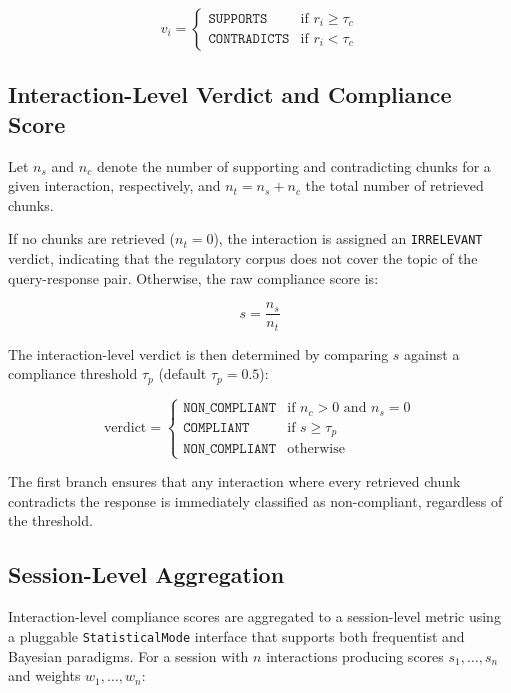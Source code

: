 \begin{equation}
    v_i = \begin{cases}
        \texttt{SUPPORTS}     & \text{if } r_i \geq \tau_c \\
        \texttt{CONTRADICTS}  & \text{if } r_i < \tau_c
    \end{cases}
\end{equation}

\subsection{Interaction-Level Verdict and Compliance Score}

Let $n_s$ and $n_c$ denote the number of supporting and contradicting chunks for a given interaction, respectively, and $n_t = n_s + n_c$ the total number of retrieved chunks.

If no chunks are retrieved ($n_t = 0$), the interaction is assigned an \texttt{IRRELEVANT} verdict, indicating that the regulatory corpus does not cover the topic of the query-response pair. Otherwise, the raw compliance score is:

\begin{equation}
    s = \frac{n_s}{n_t}
\end{equation}

The interaction-level verdict is then determined by comparing $s$ against a compliance threshold $\tau_p$ (default $\tau_p = 0.5$):

\begin{equation}
    \text{verdict} = \begin{cases}
        \texttt{NON\_COMPLIANT} & \text{if } n_c > 0 \text{ and } n_s = 0 \\
        \texttt{COMPLIANT}      & \text{if } s \geq \tau_p \\
        \texttt{NON\_COMPLIANT} & \text{otherwise}
    \end{cases}
\end{equation}

The first branch ensures that any interaction where every retrieved chunk contradicts the response is immediately classified as non-compliant, regardless of the threshold.

\subsection{Session-Level Aggregation}

Interaction-level compliance scores are aggregated to a session-level metric using a pluggable \texttt{StatisticalMode} interface that supports both frequentist and Bayesian paradigms. For a session with $n$ interactions producing scores $s_1, \ldots, s_n$ and weights $w_1, \ldots, w_n$:

